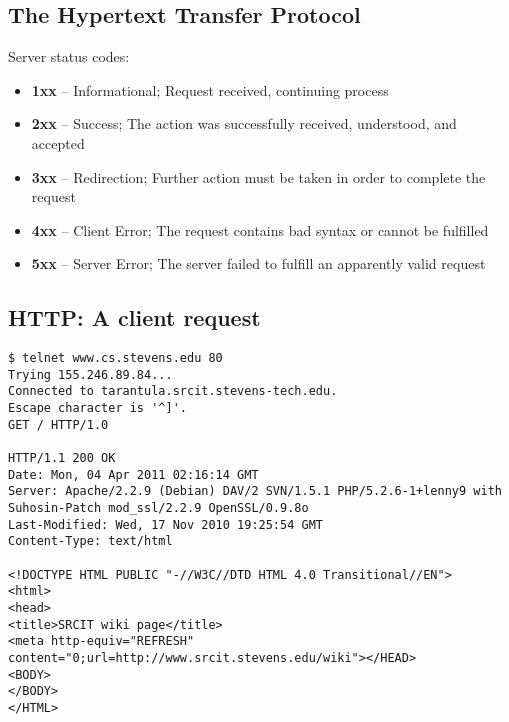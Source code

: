 \documentclass[xga]{xdvislides}
\begin{document}
\subsection{The Hypertext Transfer Protocol}
Server status codes:
\begin{itemize}
	\item {\bf 1xx} -- Informational; Request received, continuing process
	\item {\bf 2xx} -- Success; The action was successfully received,
        understood, and accepted
	\item {\bf 3xx} -- Redirection; Further action must be taken in order to
        complete the request
	\item {\bf 4xx} -- Client Error; The request contains bad syntax or
		cannot be fulfilled
	\item {\bf 5xx} -- Server Error; The server failed to fulfill an
		apparently valid request
\end{itemize}

\subsection{HTTP: A client request}
\newcommand{\smallish}{\fontsize{16}{16}\selectfont}
\smallish
\begin{center}
\begin{verbatim}
$ telnet www.cs.stevens.edu 80
Trying 155.246.89.84...
Connected to tarantula.srcit.stevens-tech.edu.
Escape character is '^]'.
GET / HTTP/1.0

HTTP/1.1 200 OK
Date: Mon, 04 Apr 2011 02:16:14 GMT
Server: Apache/2.2.9 (Debian) DAV/2 SVN/1.5.1 PHP/5.2.6-1+lenny9 with Suhosin-Patch mod_ssl/2.2.9 OpenSSL/0.9.8o
Last-Modified: Wed, 17 Nov 2010 19:25:54 GMT
Content-Type: text/html

<!DOCTYPE HTML PUBLIC "-//W3C//DTD HTML 4.0 Transitional//EN">
<html>
<head>
<title>SRCIT wiki page</title>
<meta http-equiv="REFRESH"
content="0;url=http://www.srcit.stevens.edu/wiki"></HEAD>
<BODY>
</BODY>
</HTML>
\end{verbatim}
\end{center}
\end{document}
